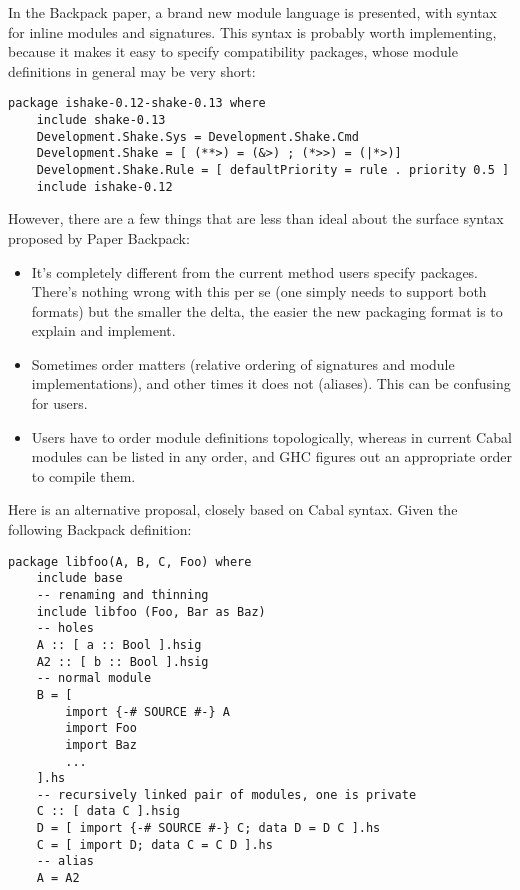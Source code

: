 \documentclass{article}
\begin{document}
In the Backpack paper, a brand new module language is presented, with
syntax for inline modules and signatures.  This syntax is probably worth implementing,
because it makes it easy to specify compatibility packages, whose module
definitions in general may be very short:

\begin{verbatim}
package ishake-0.12-shake-0.13 where
    include shake-0.13
    Development.Shake.Sys = Development.Shake.Cmd
    Development.Shake = [ (**>) = (&>) ; (*>>) = (|*>)]
    Development.Shake.Rule = [ defaultPriority = rule . priority 0.5 ]
    include ishake-0.12
\end{verbatim}

However, there are a few things that are less than ideal about the
surface syntax proposed by Paper Backpack:

\begin{itemize}
    \item It's completely different from the current method users
        specify packages. There's nothing wrong with this per se
        (one simply needs to support both formats) but the smaller
        the delta, the easier the new packaging format is to explain
        and implement.

    \item Sometimes order matters (relative ordering of signatures and
        module implementations), and other times it does not (aliases).
        This can be confusing for users.

    \item Users have to order module definitions topologically,
        whereas in current Cabal modules can be listed in any order, and
        GHC figures out an appropriate order to compile them.
\end{itemize}

Here is an alternative proposal, closely based on Cabal syntax.  Given
the following Backpack definition:

\begin{verbatim}
package libfoo(A, B, C, Foo) where
    include base
    -- renaming and thinning
    include libfoo (Foo, Bar as Baz)
    -- holes
    A :: [ a :: Bool ].hsig
    A2 :: [ b :: Bool ].hsig
    -- normal module
    B = [
        import {-# SOURCE #-} A
        import Foo
        import Baz
        ...
    ].hs
    -- recursively linked pair of modules, one is private
    C :: [ data C ].hsig
    D = [ import {-# SOURCE #-} C; data D = D C ].hs
    C = [ import D; data C = C D ].hs
    -- alias
    A = A2
\end{verbatim}
\end{document}
